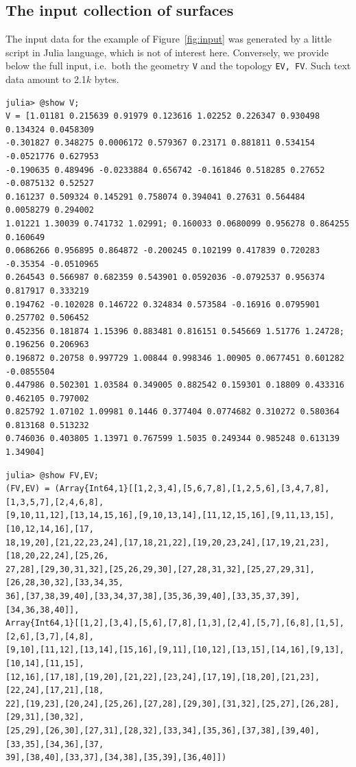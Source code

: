 \documentclass[11pt, oneside]{amsart}   	%
\begin{document}
\subsection{The input collection of surfaces}
The input data for the example of Figure~\ref{fig:input} was generated by a little script in Julia language, which is not of interest here. Conversely, we provide below the full input, i.e.~both the geometry \texttt{V} and the topology \texttt{EV, FV}. Such text data amount to 2.1$k$ bytes. 

\vspace{1mm}
\noindent
{\footnotesize
\begin{verbatim}
julia> @show V; 
V = [1.01181 0.215639 0.91979 0.123616 1.02252 0.226347 0.930498 0.134324 0.0458309 
-0.301827 0.348275 0.0006172 0.579367 0.23171 0.881811 0.534154 -0.0521776 0.627953 
-0.190635 0.489496 -0.0233884 0.656742 -0.161846 0.518285 0.27652 -0.0875132 0.52527 
0.161237 0.509324 0.145291 0.758074 0.394041 0.27631 0.564484 0.0058279 0.294002 
1.01221 1.30039 0.741732 1.02991; 0.160033 0.0680099 0.956278 0.864255 0.160649 
0.0686266 0.956895 0.864872 -0.200245 0.102199 0.417839 0.720283 -0.35354 -0.0510965 
0.264543 0.566987 0.682359 0.543901 0.0592036 -0.0792537 0.956374 0.817917 0.333219 
0.194762 -0.102028 0.146722 0.324834 0.573584 -0.16916 0.0795901 0.257702 0.506452 
0.452356 0.181874 1.15396 0.883481 0.816151 0.545669 1.51776 1.24728; 0.196256 0.206963 
0.196872 0.20758 0.997729 1.00844 0.998346 1.00905 0.0677451 0.601282 -0.0855504 
0.447986 0.502301 1.03584 0.349005 0.882542 0.159301 0.18809 0.433316 0.462105 0.797002 
0.825792 1.07102 1.09981 0.1446 0.377404 0.0774682 0.310272 0.580364 0.813168 0.513232 
0.746036 0.403805 1.13971 0.767599 1.5035 0.249344 0.985248 0.613139 1.34904]
\end{verbatim}}

{\footnotesize
\begin{verbatim}
julia> @show FV,EV;
(FV,EV) = (Array{Int64,1}[[1,2,3,4],[5,6,7,8],[1,2,5,6],[3,4,7,8],[1,3,5,7],[2,4,6,8],
[9,10,11,12],[13,14,15,16],[9,10,13,14],[11,12,15,16],[9,11,13,15],[10,12,14,16],[17,
18,19,20],[21,22,23,24],[17,18,21,22],[19,20,23,24],[17,19,21,23],[18,20,22,24],[25,26,
27,28],[29,30,31,32],[25,26,29,30],[27,28,31,32],[25,27,29,31],[26,28,30,32],[33,34,35,
36],[37,38,39,40],[33,34,37,38],[35,36,39,40],[33,35,37,39],[34,36,38,40]], 
Array{Int64,1}[[1,2],[3,4],[5,6],[7,8],[1,3],[2,4],[5,7],[6,8],[1,5],[2,6],[3,7],[4,8],
[9,10],[11,12],[13,14],[15,16],[9,11],[10,12],[13,15],[14,16],[9,13],[10,14],[11,15],
[12,16],[17,18],[19,20],[21,22],[23,24],[17,19],[18,20],[21,23],[22,24],[17,21],[18,
22],[19,23],[20,24],[25,26],[27,28],[29,30],[31,32],[25,27],[26,28],[29,31],[30,32],
[25,29],[26,30],[27,31],[28,32],[33,34],[35,36],[37,38],[39,40],[33,35],[34,36],[37,
39],[38,40],[33,37],[34,38],[35,39],[36,40]])
\end{verbatim}}
\end{document}
